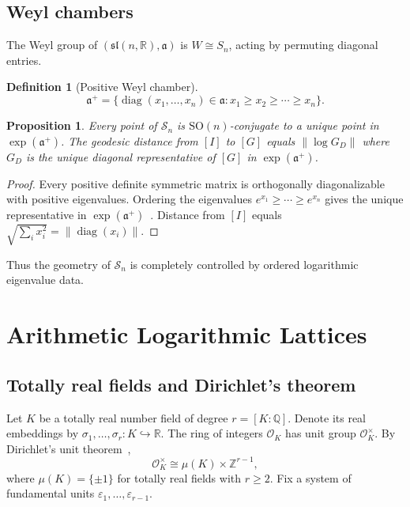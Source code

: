 \documentclass[12pt]{article}
\newtheorem{proposition}[theorem]{Proposition}
\theoremstyle{definition}
\newtheorem{definition}[theorem]{Definition}
\theoremstyle{remark}
\newcommand{\R}{\mathbb{R}}
\newcommand{\Z}{\mathbb{Z}}
\newcommand{\Q}{\mathbb{Q}}
\newcommand{\SO}{\mathrm{SO}}
\newcommand{\calM}{\mathcal{S}}
\newcommand{\diag}{\operatorname{diag}}
\begin{document}
\subsection{Weyl chambers}

The Weyl group of $(\mathfrak{sl}(n,\R), \mathfrak{a})$ is
$W \cong S_n$, acting by permuting diagonal entries.

\begin{definition}[Positive Weyl chamber]
\[
  \mathfrak{a}^+ = \{\diag(x_1,\ldots,x_n) \in \mathfrak{a} :
    x_1 \geq x_2 \geq \cdots \geq x_n\}.
\]
\end{definition}

\begin{proposition}
Every point of $\calM_n$ is $\SO(n)$-conjugate to a unique point
in $\exp(\mathfrak{a}^+)$.
The geodesic distance from $[I]$ to $[G]$ equals
$\|\log G_D\|$ where $G_D$ is the unique diagonal representative of
$[G]$ in $\exp(\mathfrak{a}^+)$.
\end{proposition}

\begin{proof}
Every positive definite symmetric matrix is orthogonally diagonalizable
with positive eigenvalues.
Ordering the eigenvalues $e^{x_1} \geq \cdots \geq e^{x_n}$ gives the
unique representative in $\exp(\mathfrak{a}^+)$~\cite[Ch.~V]{Helgason}.
Distance from $[I]$ equals $\sqrt{\sum_i x_i^2} = \|\diag(x_i)\|$.
\end{proof}

Thus the geometry of $\calM_n$ is completely controlled by ordered
logarithmic eigenvalue data.

\section{Arithmetic Logarithmic Lattices}
\label{sec:lattice}

\subsection{Totally real fields and Dirichlet's theorem}

Let $K$ be a totally real number field of degree $r = [K:\Q]$.
Denote its real embeddings by $\sigma_1,\ldots,\sigma_r : K \hookrightarrow \R$.
The ring of integers $\mathcal{O}_K$ has unit group $\mathcal{O}_K^\times$.
By Dirichlet's unit theorem~\cite{Neukirch},
\[
  \mathcal{O}_K^\times \cong \mu(K) \times \Z^{r-1},
\]
where $\mu(K) = \{\pm 1\}$ for totally real fields with $r \geq 2$.
Fix a system of fundamental units $\varepsilon_1,\ldots,\varepsilon_{r-1}$.
\end{document}
